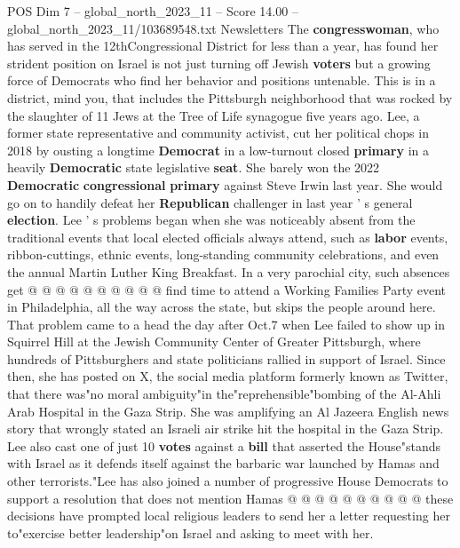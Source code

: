 \begin{textsample}{POS Dim 7 – global\_north\_2023\_11 – Score 14.00 – global\_north\_2023\_11/103689548.txt}  \label{ex:f7_pos_127}
Newsletters The \textbf{congresswoman}, who has served in the 12thCongressional District for less than a year, has found her strident position on Israel is not just turning off Jewish \textbf{voters} but a growing force of Democrats who find her behavior and positions untenable.
This is in a district, mind you, that includes the Pittsburgh neighborhood that was rocked by the slaughter of 11 Jews at the Tree of Life synagogue five years ago.
Lee, a former state representative and community activist, cut her political chops in 2018 by ousting a longtime \textbf{Democrat} in a low-turnout closed \textbf{primary} in a heavily \textbf{Democratic} state legislative \textbf{seat}.
She barely won the 2022 \textbf{Democratic} \textbf{congressional} \textbf{primary} against Steve Irwin last year.
She would go on to handily defeat her \textbf{Republican} challenger in last year ' s general \textbf{election}.
Lee ' s problems began when she was noticeably absent from the traditional events that local elected officials always attend, such as \textbf{labor} events, ribbon-cuttings, ethnic events, long-standing community celebrations, and even the annual Martin Luther King Breakfast.
In a very parochial city, such absences get @ @ @ @ @ @ @ @ @ @ find time to attend a Working Families Party event in Philadelphia, all the way across the state, but skips the people around here.
That problem came to a head the day after Oct.7 when Lee failed to show up in Squirrel Hill at the Jewish Community Center of Greater Pittsburgh, where hundreds of Pittsburghers and state politicians rallied in support of Israel.
Since then, she has posted on X, the social media platform formerly known as Twitter, that there was"no moral ambiguity"in the"reprehensible"bombing of the Al-Ahli Arab Hospital in the Gaza Strip.
She was amplifying an Al Jazeera English news story that wrongly stated an Israeli air strike hit the hospital in the Gaza Strip.
Lee also cast one of just 10 \textbf{votes} against a \textbf{bill} that asserted the House"stands with Israel as it defends itself against the barbaric war launched by Hamas and other terrorists."Lee has also joined a number of progressive House Democrats to support a resolution that does not mention Hamas @ @ @ @ @ @ @ @ @ @ these decisions have prompted local religious leaders to send her a letter requesting her to"exercise better leadership"on Israel and asking to meet with her.

\end{textsample}
